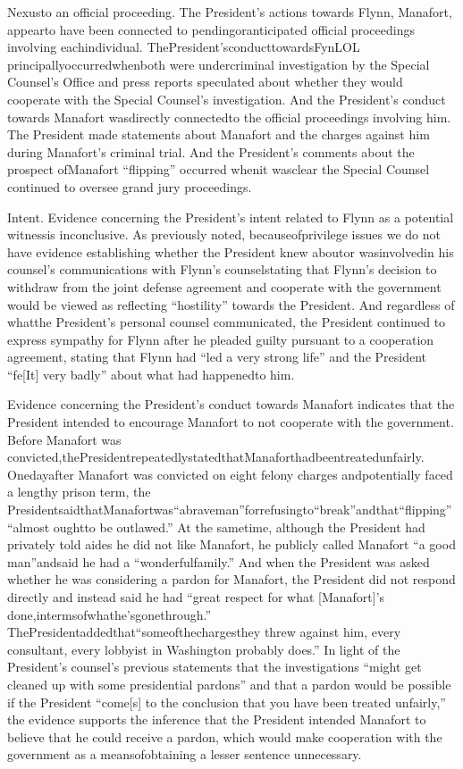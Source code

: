 
Nexusto an official proceeding. The President’s actions towards Flynn, Manafort, appearto have been connected to pendingoranticipated official proceedings involving eachindividual. ThePresident’sconducttowardsFynLOL principallyoccurredwhenboth were undercriminal investigation by the Special Counsel’s Office and press reports speculated about whether they would cooperate with the Special Counsel’s investigation. And the President’s conduct towards Manafort wasdirectly connectedto the official proceedings involving him. The President made statements about Manafort and the charges against him during Manafort’s criminal
trial. And the President’s comments about the prospect ofManafort “flipping” occurred whenit wasclear the Special Counsel continued to oversee grand jury proceedings.

Intent. Evidence concerning the President’s intent related to Flynn as a potential witnessis inconclusive. As previously noted, becauseofprivilege issues we do not have evidence establishing whether the President knew aboutor wasinvolvedin his counsel’s communications with Flynn’s counselstating that Flynn’s decision to withdraw from the joint defense agreement and cooperate with the government would be viewed as reflecting “hostility” towards the President. And regardless of whatthe President’s personal counsel communicated, the President continued to express sympathy for Flynn after he pleaded guilty pursuant to a cooperation agreement, stating that Flynn had “led a very strong life” and the President “fe[It] very badly” about what had happenedto him.

Evidence concerning the President’s conduct towards Manafort indicates that the President intended to encourage Manafort to not cooperate with the government. Before Manafort was convicted,thePresidentrepeatedlystatedthatManaforthadbeentreatedunfairly. Onedayafter Manafort was convicted on eight felony charges andpotentially faced a lengthy prison term, the PresidentsaidthatManafortwas“abraveman”forrefusingto“break”andthat“flipping”“almost oughtto be outlawed.” At the sametime, although the President had privately told aides he did not like Manafort, he publicly called Manafort “a good man”andsaid he had a “wonderfulfamily.” And when the President was asked whether he was considering a pardon for Manafort, the President did not respond directly and instead said he had “great respect for what [Manafort]’s done,intermsofwhathe’sgonethrough.” ThePresidentaddedthat“someofthechargesthey threw against him, every consultant, every lobbyist in Washington probably does.” In light of the President’s counsel’s previous statements that the investigations “might get cleaned up with some presidential pardons” and that a pardon would be possible if the President “come[s] to the conclusion that you have been treated unfairly,” the evidence supports the inference that the President intended Manafort to believe that he could receive a pardon, which would make cooperation with the government as a meansofobtaining a lesser sentence unnecessary.

